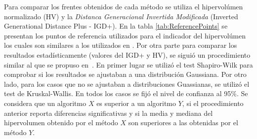 Para comparar los frentes obtenidos de cada método se utiliza el hipervolúmen normalizado (HV) y la \textit{Distanca Generacional Invertida Modificada} (Inverted Generational Distance Plus - IGD+).
%
En la tabla \ref{tab:ReferencePoints} se presentan los puntos de referencia utilizados para el indicador del hipervolúmen los cuales son similares a los utilizados en \cite{Joel:Kuhn_Munkres, Joel:OperatorAHX}.
%
Por otra parte para comparar los resultados estadísticamente (valores del IGD+ y HV), se siguió un procedimiento similar al que se propuso en~\cite{Joel:StatisticalTest}.
%
En primer lugar se utilizó el test Shapiro-Wilk para comprobar si los resultados se ajustaban a una distribución Gaussiana. 
%
%
%
%
Por otro lado, para los casos que no se ajustaban a distribuciones Guassianas, se utilizó el test de Kruskal-Wallis.
%
En todos los casos se fijó el nivel de confianza al 95\%.
%
Se considera que un algoritmo $X$ es superior a un algoritmo $Y$, si el procedimiento anterior reporta diferencias significativas y si la media y mediana del hipervolumen obtenido por el método $X$ son superiores a las obtenidas por el método $Y$.
%


